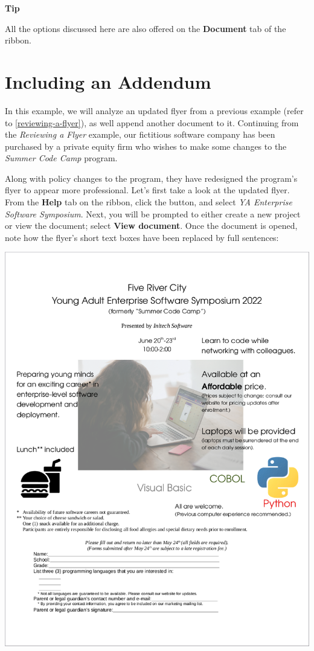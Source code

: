 \documentclass[
]{book}
\newenvironment{tipsection}
    {
    \begin{tcolorbox}[colframe=lightgray,colback=lightyellow,arc=3mm]
    \faLightbulb[regular] \textbf{Tip} \newline
    }
    {
    \end{tcolorbox}
    }
\theoremstyle{definition}
\theoremstyle{definition}
\theoremstyle{definition}
\theoremstyle{definition}
\theoremstyle{remark}
\begin{document}
\begin{tipsection}
All the options discussed here are also offered on the \textbf{Document} tab of the ribbon.

\end{tipsection}

\newpage

\hypertarget{including-an-addendum}{%
\section{Including an Addendum}\label{including-an-addendum}}

In this example, we will analyze an updated flyer from a previous example (refer to \ref{reviewing-a-flyer}), as well append another document to it. Continuing from the \emph{Reviewing a Flyer} example, our fictitious software company has been purchased by a private equity firm who wishes to make some changes to the \emph{Summer Code Camp} program.

Along with policy changes to the program, they have redesigned the program's flyer to appear more professional. Let's first take a look at the updated flyer. From the \textbf{Help} tab on the ribbon, click the  button, and select \emph{YA Enterprise Software Symposium}. Next, you will be prompted to either create a new project or view the document; select \textbf{View document}. Once the document is opened, note how the flyer's short text boxes have been replaced by full sentences:

\begin{center}\includegraphics[width=0.75\linewidth,]{Images/NonGenerated/YAEnterpriseSoftwareSymposium} \end{center}
\end{document}
